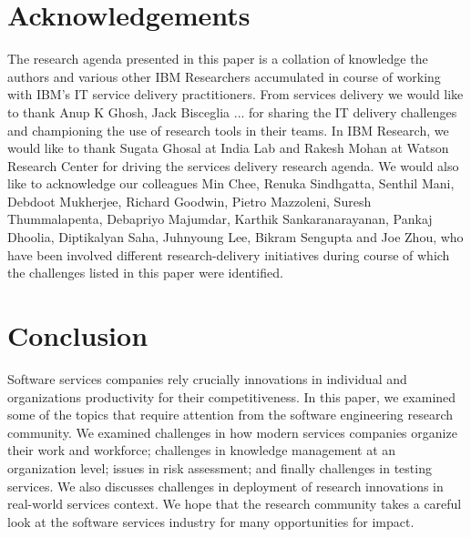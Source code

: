 \documentclass{sig-alternate}
\begin{document}


%




\section{Acknowledgements}
The research agenda presented in this paper is a collation of knowledge the authors and various other IBM Researchers accumulated in course of working with IBM's IT service delivery practitioners. From services delivery we would like to thank Anup K Ghosh, Jack Bisceglia ... for sharing the IT delivery challenges and championing the use of research tools in their teams. In IBM Research, we would like to thank Sugata Ghosal at India Lab and Rakesh Mohan at Watson Research Center for driving the services delivery research agenda. We would also like to acknowledge our colleagues Min Chee, Renuka Sindhgatta, Senthil Mani, Debdoot Mukherjee, Richard Goodwin, Pietro Mazzoleni, Suresh Thummalapenta, Debapriyo Majumdar, Karthik Sankaranarayanan, Pankaj Dhoolia, Diptikalyan Saha, Juhnyoung Lee, Bikram Sengupta and Joe Zhou, who have been involved different research-delivery initiatives during course of which the challenges listed in this paper were identified. 
\section{Conclusion}
Software services companies rely crucially innovations in individual and organizations productivity for their competitiveness. In this paper, we examined some of the topics that require attention from the software engineering research community. We examined challenges in how modern services companies organize their work and workforce; challenges in knowledge management at an organization level; issues in risk assessment; and finally challenges in testing services. We also discusses challenges in deployment of research innovations in real-world services context. We hope that the research community takes a careful look at the software services industry for many opportunities for impact.


{\small

}
\end{document}
